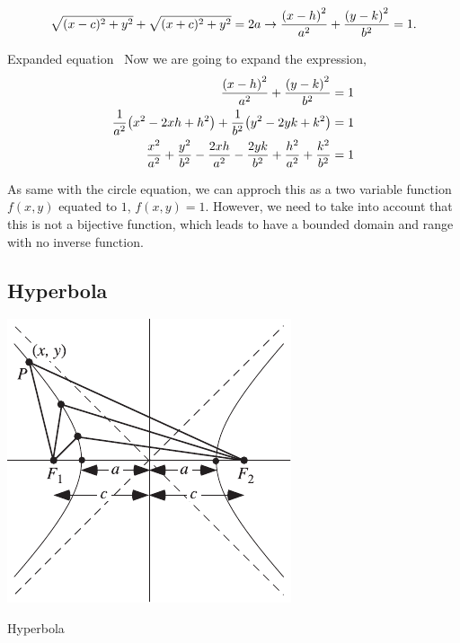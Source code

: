 \documentclass[../main-notes.tex]{subfile}
\begin{document}
\begin{gather*}
    \sqrt{(x-c)^2+y^2} + \sqrt{(x+c)^2+y^2} = 2a\to\frac{\qty(x-h)^2}{a^2} + \frac{\qty(y-k)^2}{b^2} = 1.
\end{gather*}

\begin{note}{Expanded equation}{~}
Now we are going to expand the expression,
\begin{align*}
    \frac{\qty(x-h)^2}{a^2} + \frac{\qty(y-k)^2}{b^2} &= 1 \\
    \frac{1}{a^2}\qty(x^2-2xh+h^2) + \frac{1}{b^2}\qty(y^2-2yk+k^2) &= 1 \\
    \frac{x^2}{a^2} + \frac{y^2}{b^2}
    -\frac{2xh}{a^2} -\frac{2yk}{b^2}
    +\frac{h^2}{a^2} + \frac{k^2}{b^2} &= 1
\end{align*}

As same with the circle equation, we can approch this as a two variable function $f(x,y)$ equated to $1$, $f(x,y)=1$.
However, we need to take into account that this is not a bijective function, which leads to have a bounded domain and range with no inverse function.
\end{note}

\subsection{Hyperbola}

\begin{marginfigure}
    \centering
    \includegraphics[width=\textwidth]{../Figures/hyperbola/HyperbolaFoci_750.pdf}
    \caption{Hyperbola}\label{fig-hyperbola-recap}
\end{marginfigure}
\end{document}
